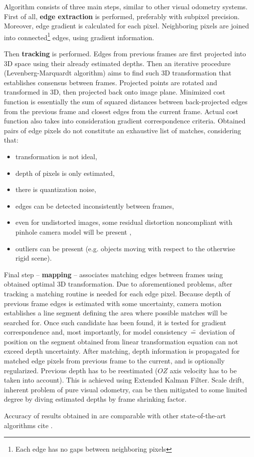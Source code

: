 Algorithm consists of three main steps, similar to other visual odometry systems. First of all, \textbf{edge extraction} is performed, preferably with subpixel precision. Moreover, edge gradient is calculated for each pixel. Neighboring pixels are joined into connected\footnote{Each edge has no gaps between neighboring pixels} edges, using gradient information.

Then \textbf{tracking} is performed. Edges from previous frames are first projected into 3D space using their already estimated depths. Then an iterative procedure (Levenberg-Marquardt algorithm) aims to find such 3D transformation that establishes consensus between frames. Projected points are rotated and transformed in 3D, then projected back onto image plane. Minimized cost function is essentially the sum of squared distances between back-projected edges from the previous frame and closest edges from the current frame. Actual cost function also takes into consideration gradient correspondence criteria. Obtained pairs of edge pixels do not constitute an exhaustive list of matches, considering that:
\begin{itemize}
\item transformation is not ideal,
\item depth of pixels is only estimated,
\item there is quantization noise,
\item edges can be detected inconsistently between frames,
\item even for undistorted images, some residual distortion noncompliant with pinhole camera model will be present \cite{barreto2007non},
\item outliers can be present (e.g. objects moving with respect to the otherwise rigid scene).
\end{itemize}
 
Final step -- \textbf{mapping} -- associates matching edges between frames using obtained optimal 3D transformation. Due to aforementioned problems, after tracking a matching routine is needed for each edge pixel. Because depth of previous frame edges is estimated with some uncertainty, camera motion establishes a line segment defining the area where possible matches will be searched for. Once such candidate has been found, it is tested for gradient correspondence and, most importantly, for model consistency~\==~deviation of position on the segment obtained from linear transformation equation can not exceed depth uncertainty. After matching, depth information is propagated for matched edge pixels from previous frame to the current, and is optionally regularized. Previous depth has to be reestimated ($OZ$ axis velocity has to be taken into account). This is achieved using Extended Kalman Filter. Scale drift, inherent problem of pure visual odometry, can be then mitigated to some limited degree by diving estimated depths by frame shrinking factor.

Accuracy of results obtained in \cite{jose2015realtime} are comparable with other state-of-the-art algorithms cite \cite{yang2017direct}.


